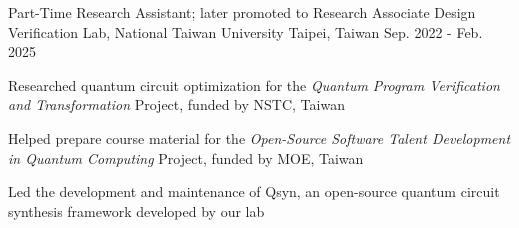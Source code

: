 

\begin{cventries}

     \cventry
        {Part-Time Research Assistant; later promoted to Research Associate}
        {Design Verification Lab, National Taiwan University}
        {Taipei, Taiwan}
        {Sep. 2022 - Feb. 2025}
        {
            \begin{cvitems}
                \item Researched quantum circuit optimization for the \emph{Quantum Program Verification and Transformation} Project, funded by NSTC, Taiwan
                \item Helped prepare course material for the \emph{Open-Source Software Talent Development in Quantum Computing} Project, funded by MOE, Taiwan
                \item Led the development and maintenance of Qsyn, an open-source quantum circuit synthesis framework developed by our lab
            \end{cvitems}
        }    
\end{cventries}
